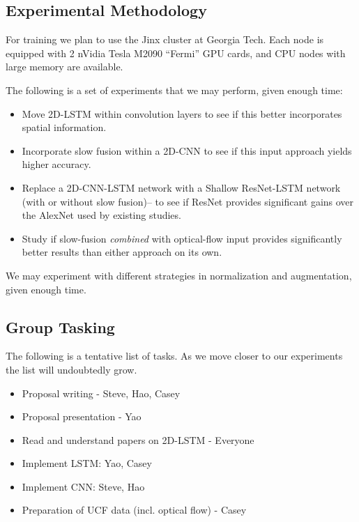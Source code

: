 \subsection*{Experimental Methodology}
For training we plan to use the Jinx cluster at Georgia Tech. Each node is equipped with 2 nVidia Tesla M2090 ``Fermi'' GPU cards, and CPU nodes with large memory are available.

The following is a set of experiments that we may perform, given enough time:
\begin{itemize}
\item Move 2D-LSTM within convolution layers to see if this better incorporates spatial information.
\item Incorporate slow fusion within a 2D-CNN to see if this input approach yields higher accuracy.
\item Replace a 2D-CNN-LSTM network with a Shallow ResNet-LSTM network (with or without slow fusion)-- to see if ResNet provides significant gains over the AlexNet used by existing studies.
\item Study if slow-fusion \emph{combined} with optical-flow input provides significantly better results than either approach on its own.
\end{itemize}
We may experiment with different strategies in normalization and augmentation, given enough time.
\subsection*{Group Tasking}
The following is a tentative list of tasks. As we move closer to our experiments the list will undoubtedly grow. 
\begin{itemize}
\item Proposal writing - Steve, Hao, Casey
\item Proposal presentation - Yao
\item Read and understand papers on 2D-LSTM - Everyone
\item Implement LSTM: Yao, Casey
\item Implement CNN: Steve, Hao
\item Preparation of UCF data (incl. optical flow) - Casey
\end{itemize}

